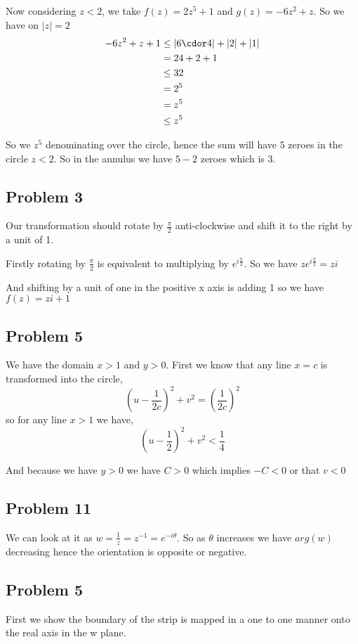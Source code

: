 \documentclass[a4paper]{report}
\begin{document}
Now considering $z < 2 $, we take $f(z) = 2z^{5} + 1$ and $g(z) = -6z^2 + z$. So we have on $|z| = 2$
\begin{align*}
    -6z^2 + z + 1 &\le |6 \cdor 4 |  + |2| + |1|\\
              &= 24 + 2 + 1\\
              &\le 32\\
              &= 2^{5}\\
              &= z^{5}\\
              &\le z^{5}
\end{align*}

So we $z^{5}$ denominating over the circle, hence the sum will have $5$ zeroes in the circle $z < 2$. So in the annulus we have $5 - 2$ zeroes which is $3$.


\subsection*{Problem 3}
Our transformation should rotate by $\frac{\pi}{2}$ anti-clockwise and shift it to the right by a unit of 1.

Firstly rotating by $\frac{\pi}{2}$ is equivalent to multiplying by $e^{i \frac{\pi}{2}}$. So we have $z e^{i\frac{\pi}{2}} = zi$

And shifting by a unit of one in the positive x axis is adding 1 so we have $f(z) = zi + 1$


 \subsection*{Problem 5}
We have the domain $x > 1$ and $y > 0$. First we know that any line $x = c$ is transformed into the circle, 
$$ (u - \frac{1}{2c})^2 + v^2 = (\frac{1}{2c})^2 $$ so for any line $x > 1$ we have, 
$$ (u - \frac{1}{2})^2 + v^2 < \frac{1}{4} $$ 

And because we have $y > 0$ we have $C > 0$ which implies $-C < 0$ or that $v < 0$

 \subsection*{Problem 11}
 We can look at it as $w = \frac{1}{z} = z^{-1} = e^{-i\theta}$.
 So as $\theta$ increases we have $arg(w)$ decreasing hence the orientation is opposite or negative.

 \subsection*{Problem 5}
 First we show the boundary of the strip is mapped in a one to one manner onto the real axis in the w plane.
\end{document}
